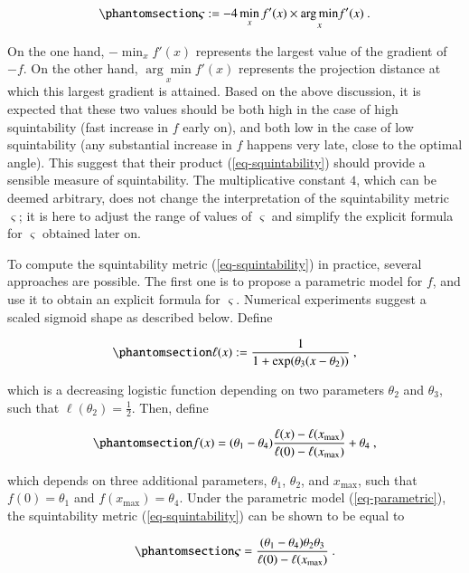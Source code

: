 \documentclass[
  number,
  preprint,
  3p]{elsarticle}
\begin{document}
\begin{equation}\phantomsection\label{eq-squintability}{
\varsigma:=-4\min_{x}f'(x)\times\underset{x}{\arg\min}f'(x)\ .
}\end{equation}

On the one hand, \(-\min_{x}f'(x)\) represents the largest value of the
gradient of \(-f\). On the other hand, \(\underset{x}{\arg\min}f'(x)\)
represents the projection distance at which this largest gradient is
attained. Based on the above discussion, it is expected that these two
values should be both high in the case of high squintability (fast
increase in \(f\) early on), and both low in the case of low
squintability (any substantial increase in \(f\) happens very late,
close to the optimal angle). This suggest that their product
(\ref{eq-squintability}) should provide a sensible measure of
squintability. The multiplicative constant \(4\), which can be deemed
arbitrary, does not change the interpretation of the squintability
metric \(\varsigma\); it is here to adjust the range of values of
\(\varsigma\) and simplify the explicit formula for \(\varsigma\)
obtained later on.

To compute the squintability metric (\ref{eq-squintability}) in
practice, several approaches are possible. The first one is to propose a
parametric model for \(f\), and use it to obtain an explicit formula for
\(\varsigma\). Numerical experiments suggest a scaled sigmoid shape as
described below. Define

\begin{equation}\phantomsection\label{eq-logistic}{
\ell(x):=\frac{1}{1+\exp(\theta_{3}(x-\theta_{2}))}\ ,
}\end{equation}

which is a decreasing logistic function depending on two parameters
\(\theta_2\) and \(\theta_3\), such that
\(\ell(\theta_{2})=\frac{1}{2}\). Then, define

\begin{equation}\phantomsection\label{eq-parametric}{
f(x)=(\theta_{1}-\theta_{4})\frac{\ell(x)-\ell(x_{\max})}{\ell(0)-\ell(x_{\max})}+\theta_{4}\ ,
}\end{equation}

which depends on three additional parameters, \(\theta_1\),
\(\theta_2\), and \(x_{\max}\), such that \(f(0)=\theta_1\) and
\(f(x_{\max})=\theta_4\). Under the parametric model
(\ref{eq-parametric}), the squintability metric (\ref{eq-squintability})
can be shown to be equal to

\begin{equation}\phantomsection\label{eq-squintability-parametric}{
\varsigma=\frac{(\theta_{1}-\theta_{4})\theta_{2}\theta_{3}}{\ell(0)-\ell(x_{\max})}\ .
}\end{equation}
\end{document}
